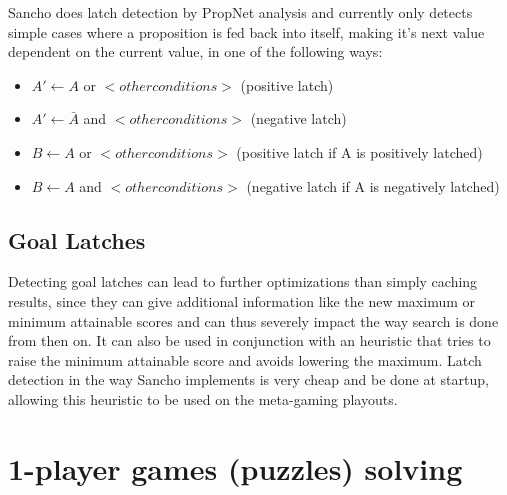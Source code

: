 Sancho does latch detection by PropNet analysis and currently only detects simple cases where a proposition is fed back into itself, making it's next value dependent on the current value, in one of the following ways:

\begin{itemize}
	\item $A' \leftarrow A$ or $<other conditions>$ (positive latch)
	\item $A' \leftarrow \bar A$ and $<other conditions>$ (negative latch)
	\item $B \leftarrow A$ or $<other conditions>$ (positive latch if A is positively latched)
	\item $B \leftarrow A$ and $<other conditions>$ (negative latch if A is negatively latched)
\end{itemize}


\subsection{Goal Latches}
Detecting goal latches can lead to further optimizations than simply caching results, since they can give additional information like the new maximum or minimum attainable scores and can thus severely impact the way search is done from then on. It can also be used in conjunction with an heuristic that tries to raise the minimum attainable score and avoids lowering the maximum.
Latch detection in the way Sancho implements is very cheap and be done at startup, allowing this heuristic to be used on the meta-gaming playouts.

\section{1-player games (puzzles) solving}

